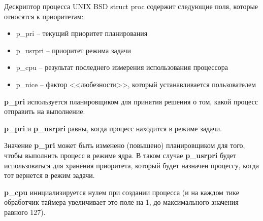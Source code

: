 Дескриптор процесса UNIX BSD struct proc содержит следующие поля, которые относятся к приоритетам:
\begin{itemize}
	\item p\_pri -- текущий приоритет планирования
	\item p\_usrpri -- приоритет режима задачи
	\item p\_cpu -- результат последнего измерения использования процессора
	\item p\_nice -- фактор <<любезности>>, который устанавливается пользователем
\end{itemize}

\textbf{p\_pri} используется планировщиком для принятия решения о том, какой процесс отправить на выполнение. 

\textbf{p\_pri} и \textbf{p\_usrpri} равны, когда процесс находится в режиме задачи. 

Значение \textbf{p\_pri} может быть изменено (повышено) планировщиком для того, чтобы выполнить процесс в режиме ядра. В таком случае \textbf{p\_usrpri} будет использоваться для хранения приоритета, который будет назначен процессу, когда тот вернется в режим задачи.

\textbf{p\_cpu} инициализируется нулем при создании процесса (и на каждом тике обработчик таймера увеличивает это поле на 1, до максимального значения равного 127).

